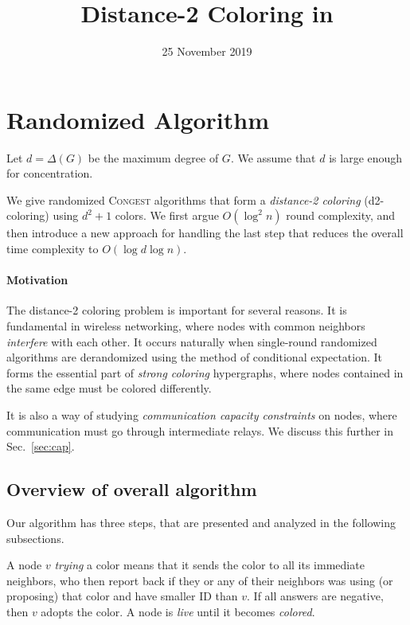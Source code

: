 \documentclass[12pt]{article}
\title{Distance-2 Coloring in {\congest}}
\author{}
\date{25 November 2019}
\newcommand{\congest}{\textsc{Congest}}
\begin{document}
\maketitle

\section{Randomized Algorithm}

Let $d = \Delta(G)$ be the maximum degree of $G$.
We assume that $d$ is large enough for concentration.

We give randomized {\congest} algorithms that form a \emph{distance-2 coloring} (d2-coloring) using $d^2+1$ colors.
We first argue $O(\log^2 n)$ round complexity, and then introduce a new approach for handling the last step that reduces the overall time complexity to $O(\log d \log n)$.

\paragraph*{Motivation} The distance-2 coloring  problem is important for several reasons. 
It is fundamental in wireless networking, where nodes with common neighbors \emph{interfere} with each other. It occurs naturally when single-round randomized algorithms are derandomized using the method of conditional expectation. 
It forms the essential part of \emph{strong coloring} hypergraphs, where nodes contained in the same edge must be colored differently. 

It is also a way of studying \emph{communication capacity constraints} on nodes, where communication must go through intermediate relays. We discuss this further in Sec.~\ref{sec:cap}.

\subsection{Overview of overall algorithm }

Our algorithm has three steps, that are presented and analyzed in the following subsections.

A node $v$ \emph{trying} a color means that it sends the color to all its immediate neighbors, who then report back if they or any of their neighbors was using (or proposing) that color and have smaller ID than $v$. If all answers are negative, then $v$ adopts the color. A node is \emph{live} until it becomes \emph{colored}.
\end{document}

